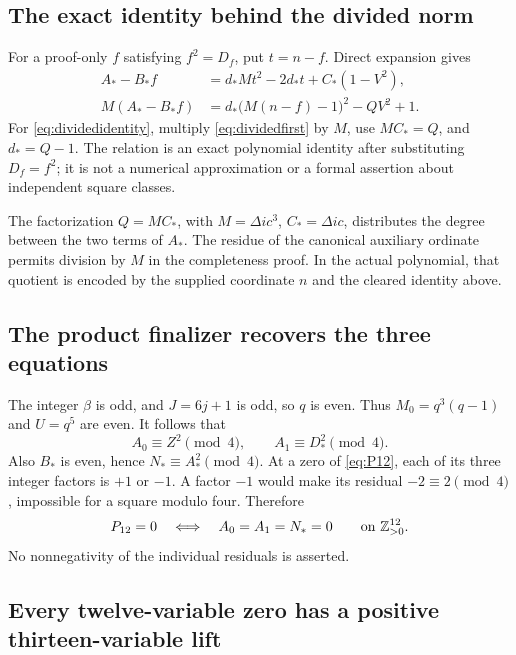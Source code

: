 \documentclass[11pt,a4paper]{article}
\theoremstyle{definition}
\theoremstyle{remark}
\newcommand{\Zpos}{\mathbb Z_{>0}}
\begin{document}
\subsection{The exact identity behind the divided norm}

For a proof-only \(f\) satisfying \(f^2=D_f\), put \(t=n-f\).
Direct expansion gives
\begin{align}
 A_*-B_*f
   &=d_*Mt^2-2d_*t+C_*(1-V^2),              \label{eq:dividedfirst}\\
 M(A_*-B_*f)
   &=d_*\bigl(M(n-f)-1\bigr)^2-QV^2+1.      \label{eq:dividedidentity}
\end{align}
For \eqref{eq:dividedidentity}, multiply \eqref{eq:dividedfirst} by
\(M\), use \(MC_*=Q\), and \(d_*=Q-1\).
The relation is an exact polynomial identity after substituting
\(D_f=f^2\); it is not a numerical approximation or a formal assertion
about independent square classes.

The factorization \(Q=MC_*\), with
\(M=\Delta ic^3\), \(C_*=\Delta ic\), distributes the degree between the
two terms of \(A_*\). The residue of the canonical auxiliary ordinate
permits division by \(M\) in the completeness proof. In the actual
polynomial, that quotient is encoded by the supplied coordinate \(n\)
and the cleared identity above.

\subsection{The product finalizer recovers the three equations}

The integer \(\beta\) is odd, and \(J=6j+1\) is odd, so \(q\) is even.
Thus \(M_0=q^3(q-1)\) and \(U=q^5\) are even. It follows that
\[
 A_0\equiv Z^2\pmod4,\qquad
 A_1\equiv D_*^2\pmod4.
\]
Also \(B_*\) is even, hence \(N_*\equiv A_*^2\pmod4\).
At a zero of \eqref{eq:P12}, each of its three integer factors is
\(+1\) or \(-1\). A factor \(-1\) would make its residual
\(-2\equiv2\pmod4\), impossible for a square modulo four.
Therefore
\begin{equation}
 P_{12}=0
 \quad\Longleftrightarrow\quad A_0=A_1=N_*=0
 \qquad\hbox{on }\Zpos^{12}.                 \label{eq:unitfinal}
\end{equation}
No nonnegativity of the individual residuals is asserted.

\subsection{Every twelve-variable zero has a positive thirteen-variable lift}
\end{document}
